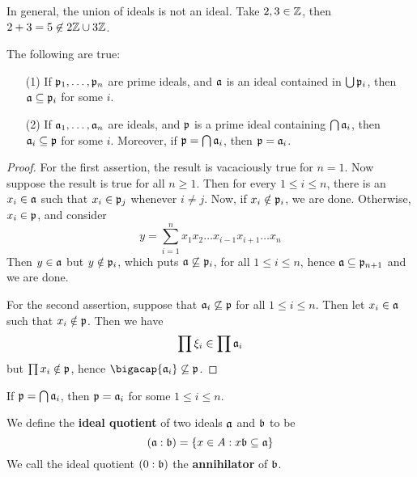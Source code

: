 \begin{example}\label{example_1.24}
  In general, the union of ideals is not an ideal. Take $2,3 \in \Z$, then
  $2+3=5 \not\in 2\Z \cup 3\Z$.
\end{example}


\begin{theorem}\label{theorem_1.10.8}
  The following are true:
  \begin{enumerate}
    \item[(1)] If $\pf_1, \dots, \pf_n$ are prime ideals, and $\af$ is an ideal
      contained in  $\bigcup{\pf_i}$, then $\af \subseteq \pf_i$ for some $i$.

    \item[(2)] If $\af_1, \dots, \af_n$ are ideals, and $\pf$ is a prime ideal
      containing  $\bigcap{\af_i}$, then $\af_i \subseteq \pf$ for some $i$.
      Moreover, if  $\pf=\bigcap{\af_i}$, then $\pf=\af_i$.
  \end{enumerate}
\end{theorem}
\begin{proof}
    For the first assertion, the result is vacaciously true for $n=1$. Now
    suppose the result is true for all  $n \geq 1$. Then for every  $1 \leq i
    \leq n$, there is an  $x_i \in \af$ such that  $x_i \in \pf_j$ whenever  $i
    \neq j$. Now, if  $x_i \notin \pf_i$, we are done. Otherwise, $x_i \in \pf$,
    and consider
    \begin{equation*}
        y=\sum_{i=1}^n{x_1x_2 \dots x_{i-1}x_{i+1} \dots x_n}
    \end{equation*}
    Then $y \in \af$ but $y \notin \pf_i$, which puts  $\af \not\subseteq
    \pf_i$, for all $1 \leq i \leq n$, hence $\af \subseteq \pf_{n+1}$ and we
    are done.

    For the second assertion, suppose that $\af_i \not\subseteq \pf$ for all
    $1 \leq i \leq n$. Then let  $x_i \in \af$ such that  $x_i \notin\pf$. Then
    we have
    \begin{equation*}
        \prod{\x_i} \in \prod{\af_i}
    \end{equation*}
    but $\prod{x_i} \notin \pf$, hence $\bigacap{\af_i} \not\subseteq \pf$.
\end{proof}
\begin{corollary}
    If $\pf=\bigcap{\af_i}$, then $\pf=\af_i$ for some  $1 \leq i \leq n$.
\end{corollary}

\begin{definition}
  We define the \textbf{ideal quotient} of two ideals $\af$ and $\bf$ to be
  \begin{equation*}
    (\af:\bf)=\{x \in A : x\bf \subseteq \af\}
  \end{equation*}
  We call the ideal quotient $(0:\bf)$ the \textbf{annihilator} of $\bf$.
\end{definition}


